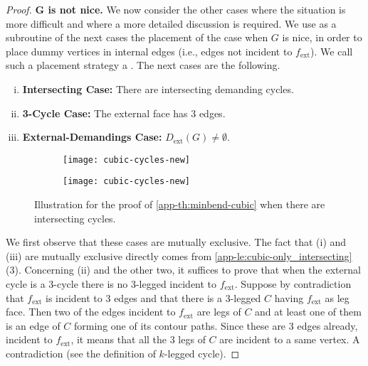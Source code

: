 \documentclass[runningheads]{llncs}
\newcommand{\ext}{\operatorname{ext}}
\let\emph\relax\DeclareTextFontCommand{\emph}{\color{dark blue}\em}
\begin{document}
\begin{proof}
 
\smallskip \noindent
{\sffamily\bfseries G is not nice.} We now consider the other cases where the situation is more difficult and where a more detailed discussion is required. We use as a subroutine of the next cases the placement of the case when $G$ is nice, in order to place dummy vertices in internal edges (i.e., edges not incident to $f_{\ext}$). We call such a placement strategy a \emph{nice-placement}. 
The next cases are the following.
\begin{enumerate}[(i)]
\item {\sffamily\bfseries Intersecting Case:} There are intersecting demanding cycles. 
\item {\sffamily\bfseries 3-Cycle Case:} The external face has 3 edges. 
\item {\sffamily\bfseries External-Demandings Case:} $D_{\ext}(G)\not=\emptyset$. 
\end{enumerate} 


\begin{figure}[t]
  \begin{subfigure}{0.45\textwidth}
    \centering
    \texttt{[image: cubic-cycles-new]}
    \subcaption{}
     \label{app-fig:intersecting-a}
  \end{subfigure}
  \hfil
  \begin{subfigure}{0.45\textwidth}
    \centering
    \texttt{[image: cubic-cycles-new]}
    \subcaption{}
     \label{app-fig:intersecting-b}
  \end{subfigure}
  \hfil
  \caption{Illustration for the proof of \cref{app-th:minbend-cubic}
    when there are intersecting cycles.}
  \label{app-fig:intersecting}
\end{figure}

We first observe that these cases are mutually exclusive. The fact that (i)
 and (iii) are mutually exclusive directly comes from \cref{app-le:cubic-only_intersecting}(3). Concerning (ii) and the other two, it suffices to prove that when the external cycle is a 3-cycle there is no 3-legged incident to $f_{\ext}$. Suppose by contradiction that $f_{\ext}$ is incident to 3 edges and that there is a 3-legged $C$ having $f_{\ext}$ as leg face. Then two of the edges incident to $f_{\ext}$ are legs of $C$ and at least one of them is an edge of $C$ forming one of its contour paths. Since these are 3 edges already, incident to $f_{\ext}$, it means that all the 3 legs of $C$ are incident to a same vertex. A contradiction (see the definition of $k$-legged cycle).
 

\end{proof}
\end{document}
